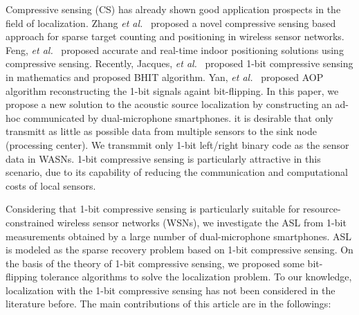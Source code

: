 Compressive sensing (CS) has already shown good application prospects in the field of localization.
Zhang \emph{et al.}~\cite{zhang2011sparse} proposed a novel compressive sensing based approach for sparse target counting and positioning in wireless sensor networks. 
Feng, \emph{et al.}~\cite{feng2010compressive}
proposed accurate and real-time indoor positioning solutions using compressive sensing. 
Recently, Jacques, \emph{et al.}~\cite{Laska2013Robust} proposed 1-bit compressive sensing in mathematics and proposed BHIT algorithm. Yan, \emph{et al.}~\cite{Yan2012}  proposed AOP algorithm reconstructing the 1-bit signals againt bit-flipping.
%
In this paper, we propose a new solution to
the acoustic source localization by constructing an ad-hoc communicated by dual-microphone
smartphones. 
it is desirable that only transmitt as little as possible data from multiple sensors to the sink node (processing 
center). 
%
We transmmit only 1-bit left/right binary code as the sensor data in WASNs. 
1-bit compressive sensing is particularly attractive in this scenario, due to its capability of reducing the communication and computational costs of local sensors. 
%




Considering that 1-bit compressive sensing is particularly suitable for resource-constrained wireless sensor networks (WSNs), we investigate the ASL from 1-bit measurements obtained by a large number of dual-microphone smartphones.
ASL is modeled  as the sparse recovery problem based on 1-bit compressive sensing.
On the basis of the theory of 1-bit compressive sensing, we proposed some bit-flipping tolerance algorithms to solve the localization problem. To our knowledge, localization with the 1-bit compressive sensing has not been considered in the literature before.
The main contributions of this article are in the followings: 

